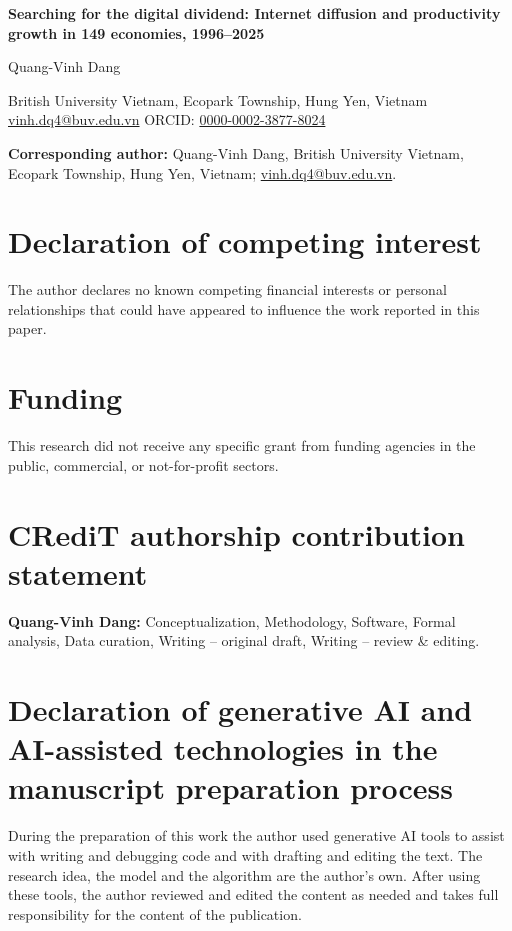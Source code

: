 \documentclass[12pt]{article}
\begin{document}
\onehalfspacing
\begin{center}
{\Large\bfseries Searching for the digital dividend: Internet diffusion and productivity growth in 149 economies, 1996--2025\par}
\vspace{1.5em}
{\large Quang-Vinh Dang\par}
\vspace{0.5em}
British University Vietnam, Ecopark Township, Hung Yen, Vietnam\\
\href{mailto:vinh.dq4@buv.edu.vn}{vinh.dq4@buv.edu.vn} \quad ORCID: \href{https://orcid.org/0000-0002-3877-8024}{0000-0002-3877-8024}
\end{center}

\vspace{1em}
\noindent\textbf{Corresponding author:} Quang-Vinh Dang, British University Vietnam, Ecopark Township, Hung Yen, Vietnam; \href{mailto:vinh.dq4@buv.edu.vn}{vinh.dq4@buv.edu.vn}.

\section*{Declaration of competing interest}
The author declares no known competing financial interests or personal relationships that could have appeared to influence the work reported in this paper.

\section*{Funding}
This research did not receive any specific grant from funding agencies in the public, commercial, or not-for-profit sectors.

\section*{CRediT authorship contribution statement}
\textbf{Quang-Vinh Dang:} Conceptualization, Methodology, Software, Formal analysis, Data curation, Writing -- original draft, Writing -- review \& editing.

\section*{Declaration of generative AI and AI-assisted technologies in the manuscript preparation process}
During the preparation of this work the author used generative AI tools to assist with writing and debugging code and with drafting and editing the text. The research idea, the model and the algorithm are the author's own. After using these tools, the author reviewed and edited the content as needed and takes full responsibility for the content of the publication.
\end{document}
